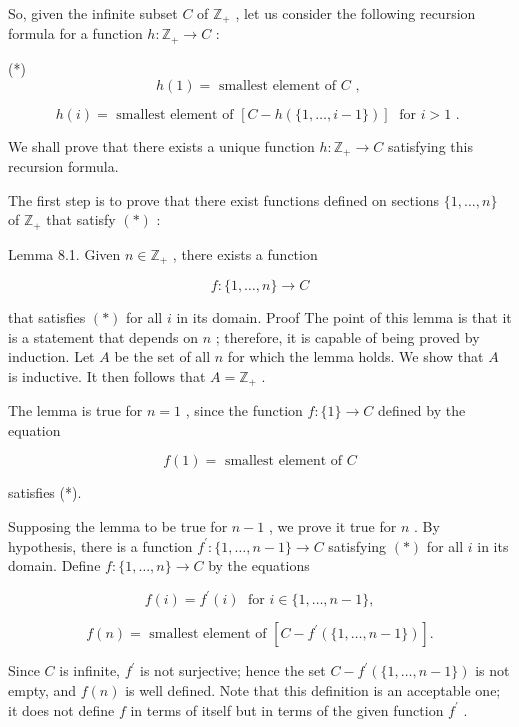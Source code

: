 So, given the infinite subset \(C\) of \({\mathbb{Z}}_{ + }\) , let us consider the following recursion formula for a function \(h : {\mathbb{Z}}_{ + } \rightarrow  C\) :

(*)
\[
h\left( 1\right)  = \text{ smallest element of }C\text{ , }
\]

\[
h\left( i\right)  = \text{ smallest element of }\left\lbrack  {C - h\left( {\{ 1,\ldots ,i - 1\} }\right) }\right\rbrack  \;\text{ for }i > 1\text{ . }
\]

We shall prove that there exists a unique function \(h : {\mathbb{Z}}_{ + } \rightarrow  C\) satisfying this recursion formula.

The first step is to prove that there exist functions defined on sections \(\{ 1,\ldots ,n\}\) of \({\mathbb{Z}}_{ + }\) that satisfy \(\left( *\right)\) :

Lemma 8.1. Given \(n \in  {\mathbb{Z}}_{ + }\) , there exists a function

\[
f : \{ 1,\ldots ,n\}  \rightarrow  C
\]

that satisfies \(\left( *\right)\) for all \(i\) in its domain. Proof The point of this lemma is that it is a statement that depends on \(n\) ; therefore, it is capable of being proved by induction. Let \(A\) be the set of all \(n\) for which the lemma holds. We show that \(A\) is inductive. It then follows that \(A = {\mathbb{Z}}_{ + }\) .

The lemma is true for \(n = 1\) , since the function \(f : \{ 1\}  \rightarrow  C\) defined by the equation

\[
f\left( 1\right)  = \text{ smallest element of }C
\]

satisfies (*).

Supposing the lemma to be true for \(n - 1\) , we prove it true for \(n\) . By hypothesis, there is a function \({f}^{\prime } : \{ 1,\ldots ,n - 1\}  \rightarrow  C\) satisfying \(\left( *\right)\) for all \(i\) in its domain. Define \(f : \{ 1,\ldots ,n\}  \rightarrow  C\) by the equations

\[
f\left( i\right)  = {f}^{\prime }\left( i\right) \;\text{ for }i \in  \{ 1,\ldots ,n - 1\} ,
\]

\[
f\left( n\right)  = \text{ smallest element of }\left\lbrack  {C - {f}^{\prime }\left( {\{ 1,\ldots ,n - 1\} }\right) }\right\rbrack  .
\]

Since \(C\) is infinite, \({f}^{\prime }\) is not surjective; hence the set \(C - {f}^{\prime }\left( {\{ 1,\ldots ,n - 1\} }\right)\) is not empty, and \(f\left( n\right)\) is well defined. Note that this definition is an acceptable one; it does not define \(f\) in terms of itself but in terms of the given function \({f}^{\prime }\) .

